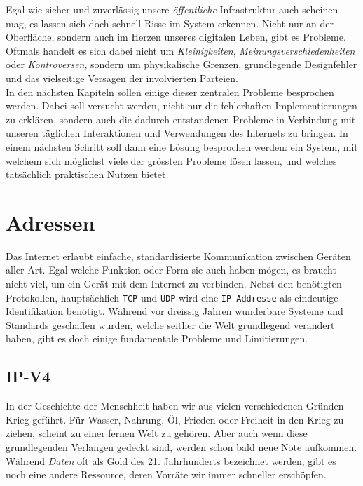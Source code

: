 \documentclass[a4paper,11pt,titlepage,twoside]{memoir}
\begin{document}
\noindent Egal wie sicher und zuverlässig unsere \emph{öffentliche}
Infrastruktur auch scheinen mag, es lassen sich doch schnell Risse im
System erkennen. Nicht nur an der Oberfläche, sondern auch im Herzen
unseres digitalen Leben, gibt es Probleme. Oftmals handelt es sich
dabei nicht um \emph{Kleinigkeiten}, \emph{Meinungsverschiedenheiten} oder
\emph{Kontroversen}, sondern um physikalische Grenzen, grundlegende
Designfehler und das vielseitige Versagen der involvierten Parteien.\\

\noindent In den nächsten Kapiteln sollen einige dieser zentralen
Probleme besprochen werden. Dabei soll versucht werden, nicht nur die
fehlerhaften Implementierungen zu erklären, sondern auch die dadurch
entstandenen Probleme in Verbindung mit unseren täglichen
Interaktionen und Verwendungen des Internets zu bringen. In einem
nächsten Schritt soll dann eine Lösung besprochen werden: ein System,
mit welchem sich möglichst viele der grössten Probleme lösen lassen,
und welches tatsächlich praktischen Nutzen bietet.\\
\section{Adressen}
\label{sec:orgb2ed657}
Das Internet erlaubt einfache, standardisierte Kommunikation zwischen
Geräten aller Art. Egal welche Funktion oder Form sie auch haben
mögen, es braucht nicht viel, um ein Gerät mit dem Internet zu
verbinden. Nebst den benötigten Protokollen, hauptsächlich \texttt{TCP} und \texttt{UDP}
wird eine \texttt{IP-Addresse} als eindeutige Identifikation benötigt. Während
vor dreissig Jahren wunderbare Systeme und Standards geschaffen wurden,
welche seither die Welt grundlegend verändert haben, gibt es doch
einige fundamentale Probleme und Limitierungen.
\subsection{IP-V4}
\label{sec:org94f2813}
\noindent In der Geschichte der Menschheit haben wir aus vielen
verschiedenen Gründen Krieg geführt. Für Wasser, Nahrung, Öl, Frieden
oder Freiheit in den Krieg zu ziehen, scheint zu einer fernen Welt zu
gehören. Aber auch wenn diese grundlegenden Verlangen gedeckt sind,
werden schon bald neue Nöte aufkommen. Während \emph{Daten} oft als Gold
des 21. Jahrhunderts bezeichnet werden, gibt es noch eine andere
Ressource, deren Vorräte wir immer schneller erschöpfen. \\
\end{document}
